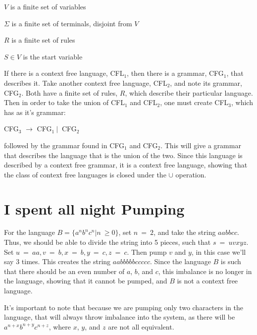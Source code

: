 \documentclass[10pt,reqno,sumlimits]{amsart}
\theoremstyle{plain}
\theoremstyle{definition}
\newcommand{\1}{{\bf 1}}
\numberwithin{equation}{section}
\begin{document}
\hspace{0.5in}$V$ is a finite set of variables

\hspace{0.5in}$\Sigma$ is a finite set of terminals, disjoint from $V$

\hspace{0.5in}$R$ is a finite set of rules

\hspace{0.5in}$S \in V$ is the start variable

\hspace{0.3in}If there is a context free language, CFL$_1$, then there is a grammar, CFG$_1$, that describes it. Take another context free language, CFL$_2$, and note its grammar, CFG$_2$. Both have a finite set of rules, $R$, which describe their particular language. Then in order to take the union of CFL$_1$ and CFL$_2$, one must create CFL$_3$, which has as it's grammar:

\hspace{0.5in} CFG$_3$ $\rightarrow$ CFG$_1 \ |\ $ CFG$_2$

\hspace{0.3in} followed by the grammar found in CFG$_1$ and CFG$_2$. This will give a grammar that describes the language that is the union of the two. Since this language is described by a context free grammar, it is a context free language, showing that the class of context free languages is closed under the $\cup$ operation.


\section {I spent all night Pumping}
For the language $B = \{a^nb^nc^n|n\ \geq 0\}$, set $n\ =\ 2$, and take the string $aabbcc$. Thus, we should be able to divide the string into 5 pieces, such that $s\ =\ uvxyz$. Set $u\ =\ aa, v\ =\ b, x\ =\ b, y\ =\ c, z\ =\ c$. Then pump $v$ and $y$, in this case we'll say 3 times. This creates the string $aabbbbbccccc$. Since the language $B$ is such that there should be an even number of $a$, $b$, and $c$, this imbalance is no longer in the language, showing that it cannot be pumped, and $B$ is not a context free language.

It's important to note that because we are pumping only two characters in the language, that will always throw imbalance into the system, as there will be $a^{n+x}b^{n+y}c^{n+z}$, where $x$, $y$, and $z$ are not all equivalent.
\end{document}
